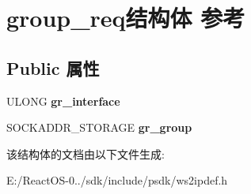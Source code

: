 \hypertarget{structgroup__req}{}\section{group\+\_\+req结构体 参考}
\label{structgroup__req}
\subsection*{Public 属性}
\begin{DoxyCompactItemize}
\item 
\mbox{\label{structgroup__req_ac2505eb42a0dab0ee22fc5be9b7d5ba5}} 
U\+L\+O\+NG {\bfseries gr\+\_\+interface}
\item 
\mbox{\label{structgroup__req_ab217bda28a85a902f115bd188d5eed3a}} 
S\+O\+C\+K\+A\+D\+D\+R\+\_\+\+S\+T\+O\+R\+A\+GE {\bfseries gr\+\_\+group}
\end{DoxyCompactItemize}


该结构体的文档由以下文件生成\+:\begin{DoxyCompactItemize}
\item 
E\+:/\+React\+O\+S-\/0../sdk/include/psdk/ws2ipdef.\+h\end{DoxyCompactItemize}
